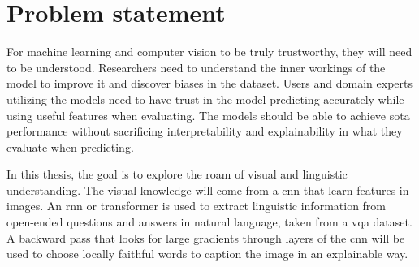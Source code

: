 \label{sec:1_2_problem_statement}

\begin{comment}
In a short and precise way, state what your research is about in this thesis. It can be in the form of a (set of) research questions, goals/aims, or objectives (or a mix) - but it should clearly state what the problems or challenges you are addressing.

Alternatively, one can state a research hypothesis, but if so, it should follow the rules of what a hypothesis is. A hypothesis is a statement that introduces a research question and proposes an expected result. It is an integral part of the scientific method that forms the basis of scientific experiments. Therefore, you need to be careful and thorough when building your hypothesis, following the “rules”.
\end{comment}

\section{Problem statement}

For machine learning and computer vision to be truly trustworthy, they will need to be understood. Researchers need to understand the inner workings of the model to improve it and discover biases in the dataset. Users and domain experts utilizing the models need to have trust in the model predicting accurately while using useful features when evaluating. The models should be able to achieve \gls{sota} performance without sacrificing interpretability and explainability in what they evaluate when predicting. 

In this thesis, the goal is to explore the roam of visual and linguistic understanding.
The visual knowledge will come from a \gls{cnn} that learn features in images. An \gls{rnn} \cite{rumelhartLearningRepresentationsBackpropagating1986, choLearningPhraseRepresentations2014, sutskeverSequenceSequenceLearning2014, bahdanauNeuralMachineTranslation2016} or transformer is used to extract linguistic information from open-ended questions and answers in natural language, taken from a \gls{vqa} dataset. A backward pass that looks for large gradients through layers of the \gls{cnn} will be used to choose locally faithful words to caption the image in an explainable way. 


